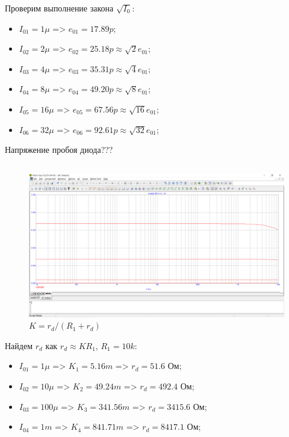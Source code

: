 \documentclass[a4paper, 12pt]{article}%
\begin{document}
Проверим выполнение закона $\sqrt{I_0}$:
\begin{itemize}
    \item $I_{01} = 1\mu$ => $e_{01} = 17.89p$;
    \item $I_{02} = 2\mu$ => $e_{02} = 25.18p \approx \sqrt{2}e_{01}$;
    \item $I_{03} = 4\mu$ => $e_{03} = 35.31p \approx \sqrt{4}e_{01}$; 
    \item $I_{04} = 8\mu$ => $e_{04} = 49.20p \approx \sqrt{8}e_{01}$;
    \item $I_{05} = 16\mu$ => $e_{05} = 67.56p \approx \sqrt{16}e_{01}$;
    \item $I_{06} = 32\mu$ => $e_{06} = 92.61p \approx \sqrt{32}e_{01}$;
\end{itemize}

Напряжение пробоя диода???

\subsection{}

\begin{figure}[h!]
    \centering
    \includegraphics[scale = 0.4 \textwidth]{images/mod2_2.png}
    \caption{$K = r_d/(R_1 + r_d)$}
    \label{fig:m212}
\end{figure}

Найдем $r_d$ как $r_d \approx K R_1$, $R_1 = 10k$:

\begin{itemize}
    \item $I_{01} = 1\mu$ => $K_{1} = 5.16m$ => $r_d = 51.6$ Ом;
    \item $I_{02} = 10\mu$ => $K_{2} = 49.24m$ => $r_d = 492.4$ Ом;
    \item $I_{03} = 100\mu$ => $K_{3} = 341.56m$ => $r_d = 3415.6$ Ом;
    \item $I_{04} = 1m$ => $K_{4} = 841.71m$ => $r_d = 8417.1$ Ом;
\end{itemize}
\end{document}
